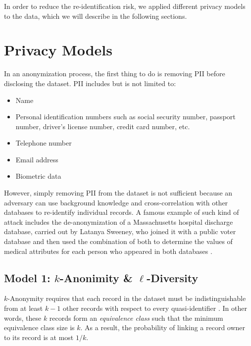 \documentclass[a4paper, 11pt]{article}
\begin{document}
In order to reduce the re-identification risk, we applied different privacy 
models to the data, which we will describe in the following sections.

\pagebreak

\section{Privacy Models} \label{sec:privacy}

In an anonymization process, the first thing to do is removing PII before 
disclosing the dataset. PII includes but is not limited to:

\begin{multicols}{2}
\begin{itemize}
    \item Name
    \item Personal identification numbers such as social security number, 
passport number, driver's license number, credit card number, etc.

    \item Telephone number
    \item Email address
    \item Biometric data
\end{itemize}
\end{multicols}

However, simply removing PII from the dataset is not sufficient because an 
adversary can use background knowledge and cross-correlation with other 
databases to re-identify individual records. A famous example of such kind of 
attack includes the de-anonymization of a Massachusetts hospital discharge 
database, carried out by Latanya Sweeney, who joined it with a public voter 
database and then used the combination of both to determine the values of 
medical attributes for each person who appeared in both databases 
\cite{sweeney_2021}.

\subsection{Model 1: $k$-Anonimity \& $\ell$-Diversity}

$k$-Anonymity requires that each record in the dataset must be 
indistinguishable from at least $k - 1$ other records with respect to every 
quasi-identifier \cite{Sweeney2002kAnonymityAM}. In other words, these $k$ 
records form an \textit{equivalence class} such that the minimum equivalence 
class size is $k$. As a result, the probability of linking a record owner to 
its record is at most $1/k$.
\end{document}
